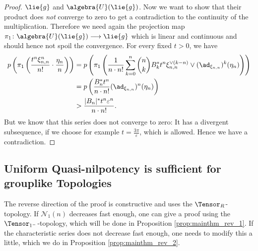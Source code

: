 \documentclass[
11pt,                          %
english                        %
]{article}
\begin{document}
\begin{proof}
	$\lie{g}$ and $\algebra{U}(\lie{g})$.
	Now we want to show that their product does \emph{not} converge to zero
	to get a contradiction to the continuity of the multiplication. Therefore
	we need again the projection map $\pi_1 \colon \algebra{U}(\lie{g}) 
	\longrightarrow \lie{g}$ which is linear and continuous and should hence not 
	spoil the convergence. For every fixed $t > 0$, we have
	\begin{align*}
		p \left(
			\pi_1\left(
				\frac{t^n \xi_{n,n}^n}{n!}
				\cdot
				\frac{\eta_n}{n}
			\right)
		\right)
		&=
		p\left(
			\pi_1 \left(
				\frac{1}{n \cdot n!}
				\sum\limits_{k=0}^n
				\binom{n}{k}
				B_k^* t^n
				\xi_{n,n}^{\vee(k-n)}
				\vee
				(\ad_{\xi_{n,n}})^k(\eta_n)
			\right)
		\right)
		\\
		& =
		p\left(
			\frac{B_n^* t^n}{n \cdot n!}
			(\ad_{\xi_{n,n}})^n(\eta_n)
		\right)
		\\
		& >
		\frac{|B_n|^* t^n \varepsilon^n}{n \cdot n!}.
	\end{align*}
	But we know that this series does not converge to zero: It has a divergent 
	subsequence, if we choose for example $t = \frac{3 \pi}{\varepsilon}$, which is 
	allowed. Hence we have a contradiction.
\end{proof}


\subsection{Uniform Quasi-nilpotency is sufficient for grouplike Topologies}

The reverse direction of the proof is constructive and uses the 
$\Tensor_R$-topology. If $\mathcal{N}_1(n)$ decreases fast enough, one can
give a proof using the $\Tensor_{1^-}$-topology, which will be done in Proposition
\ref{prop:mainthm_rev_1}. If the characteristic series does not decrease fast 
enough, one needs to modify this a little, which we do in Proposition
\ref{prop:mainthm_rev_2}.
\end{document}
